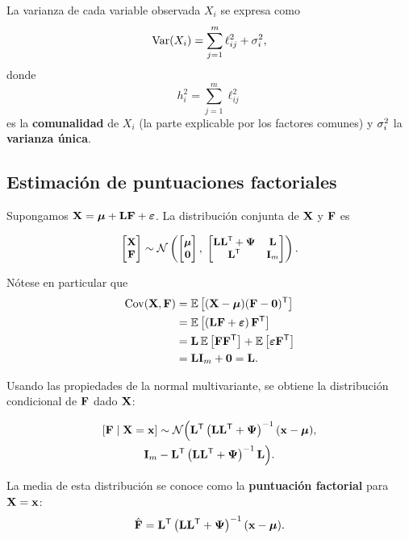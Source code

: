 La varianza de cada variable observada $X_i$ se expresa como
\begin{equation}
  \label{eq:comunalidad}
  \operatorname{Var}(X_i)=\sum_{j=1}^{m}\ell_{ij}^2+\sigma_i^2,
\end{equation}
donde
\begin{equation}
  \label{eq:h2}
  h_i^2=\sum_{j=1}^{m}\ell_{ij}^2
\end{equation}
es la \textbf{comunalidad} de $X_i$ (la parte explicable por los factores
comunes) y $\sigma_i^2$ la \textbf{varianza \'unica}.

\subsection{Estimaci\'on de puntuaciones factoriales}
\label{subsec:puntuaciones_factoriales}

Supongamos $\mathbf{X}=\boldsymbol{\mu}+\mathbf{L}\mathbf{F}+\boldsymbol{\varepsilon}$. La distribuci\'on conjunta de
$\mathbf{X}$ y $\mathbf{F}$ es

\begin{equation}
  \label{eq:conjunta_XF}
  \small
  \begin{bmatrix}\mathbf{X}\\ \mathbf{F}\end{bmatrix}
  \sim\mathcal{N}\left( 
    \begin{bmatrix}\boldsymbol{\mu}\\ \mathbf{0}\end{bmatrix},\;
    \begin{bmatrix}
      \mathbf{L}\mathbf{L}^{\mathsf{T}}+\boldsymbol{\Psi} & \mathbf{L}\\
      \mathbf{L}^{\mathsf{T}} & \mathbf{I}_m
    \end{bmatrix} \right).
\end{equation}

N\'otese en particular que
\begin{equation}
  \label{eq:cov_XF}
  \begin{aligned}
    \operatorname{Cov}(\mathbf{X},\mathbf{F})
      &=\mathbb{E}\left[ (\mathbf{X}-\boldsymbol{\mu})(\mathbf{F}-\mathbf{0})^{\mathsf{T}} \right]\\
      &=\mathbb{E}\left[ \left( \mathbf{L}\mathbf{F}+\boldsymbol{\varepsilon} \right)\mathbf{F}^{\mathsf{T}} \right]\\
      &=\mathbf{L}\,\mathbb{E}\left[ \mathbf{F}\mathbf{F}^{\mathsf{T}} \right]+\mathbb{E}\left[ \boldsymbol{\varepsilon}\mathbf{F}^{\mathsf{T}} \right]\\
      &=\mathbf{L}\mathbf{I}_m+\mathbf{0}=\mathbf{L}.
  \end{aligned}
\end{equation}

Usando las propiedades de la normal multivariante, se obtiene la distribuci\'on
condicional de $\mathbf{F}$ dado $\mathbf{X}$:

\begin{multline}
  \label{eq:condicional_F}
  \left[ \mathbf{F}\mid\mathbf{X}=\mathbf{x} \right]\sim
  \mathcal{N}\Big(
    \mathbf{L}^{\mathsf{T}}\left( \mathbf{L}\mathbf{L}^{\mathsf{T}}+\boldsymbol{\Psi} \right)^{-1}(\mathbf{x}-\boldsymbol{\mu}),\\
    \mathbf{I}_m-\mathbf{L}^{\mathsf{T}}\left( \mathbf{L}\mathbf{L}^{\mathsf{T}}+\boldsymbol{\Psi} \right)^{-1}\mathbf{L}\Big).
\end{multline}

La media de esta distribuci\'on se conoce como la \textbf{puntuaci\'on
factorial} para $\mathbf{X}=\mathbf{x}$:
\begin{equation}
  \label{eq:puntuacion_factorial}
  \hat{\mathbf{F}}
  =\mathbf{L}^{\mathsf{T}}\left( \mathbf{L}\mathbf{L}^{\mathsf{T}}+\boldsymbol{\Psi} \right)^{-1}(\mathbf{x}-\boldsymbol{\mu}).
\end{equation}
